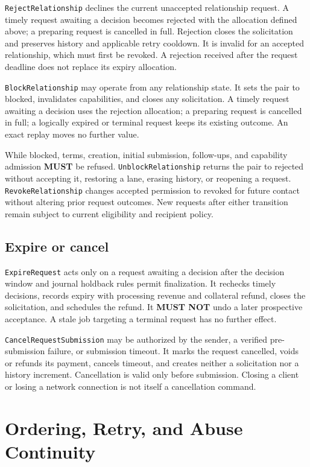 \documentclass[11pt]{article}
\newcommand{\MUST}{\textbf{MUST}}
\newcommand{\MUSTNOT}{\textbf{MUST NOT}}
\begin{document}
\texttt{RejectRelationship} declines the current unaccepted relationship request.
A timely request awaiting a decision becomes rejected with the allocation defined above; a
preparing request is cancelled in full. Rejection closes the solicitation and
preserves history and applicable retry cooldown. It is invalid for an accepted
relationship, which must first be revoked. A rejection received after the request
deadline does not replace its expiry allocation.

\texttt{BlockRelationship} may operate from any relationship state. It sets the
pair to blocked, invalidates capabilities, and closes any solicitation. A timely
request awaiting a decision uses the rejection allocation; a preparing request is cancelled in
full; a logically expired or terminal request keeps its existing outcome. An
exact replay moves no further value.

While blocked, terms, creation, initial submission, follow-ups, and capability
admission \MUST{} be refused. \texttt{UnblockRelationship} returns the pair to
rejected without accepting it, restoring a lane, erasing history, or reopening a
request. \texttt{RevokeRelationship} changes accepted permission to revoked for
future contact without altering prior request outcomes. New requests after either
transition remain subject to current eligibility and recipient policy.

\subsection{Expire or cancel}

\texttt{ExpireRequest} acts only on a request awaiting a decision after the decision window
and journal holdback rules permit finalization. It rechecks timely decisions,
records expiry with processing revenue and collateral refund, closes the
solicitation, and schedules the refund. It \MUSTNOT{} undo a later prospective
acceptance. A stale job targeting a terminal request has no further effect.

\texttt{CancelRequestSubmission} may be authorized by the sender, a verified
pre-submission failure, or submission timeout. It marks the request cancelled,
voids or refunds its payment, cancels timeout, and creates neither a solicitation
nor a history increment. Cancellation is valid only before submission. Closing a
client or losing a network connection is not itself a cancellation command.

\section{Ordering, Retry, and Abuse Continuity}
\end{document}
